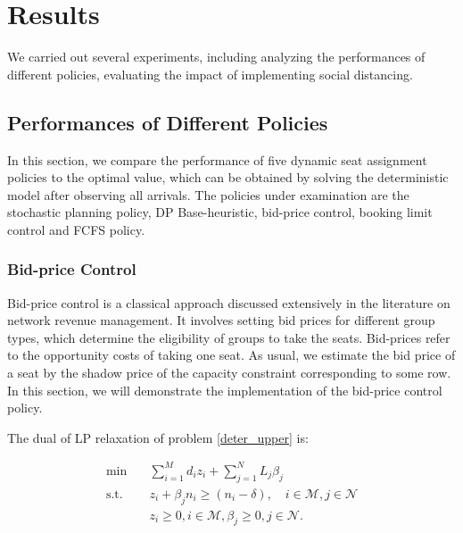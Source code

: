 \section{Results}
We carried out several experiments, including analyzing the performances of different policies, evaluating the impact of implementing social distancing.


\subsection{Performances of Different Policies}
In this section, we compare the performance of five dynamic seat assignment policies to the optimal value, which can be obtained by solving the deterministic model after observing all arrivals. The policies under examination are the stochastic planning policy, DP Base-heuristic, bid-price control, booking limit control and FCFS policy. 


\subsubsection*{Bid-price Control}
Bid-price control is a classical approach discussed extensively in the literature on network revenue management. It involves setting bid prices for different group types, which determine the eligibility of groups to take the seats. Bid-prices refer to the opportunity costs of taking one seat. As usual, we estimate the bid price of a seat by the shadow price of the capacity constraint corresponding to some row. In this section, we will demonstrate the implementation of the bid-price control policy. 

The dual of LP relaxation of problem \eqref{deter_upper} is:

\begin{equation}\label{bid-price_dual}
  \begin{aligned}
  \min \quad & \sum_{i=1}^{M} d_i z_i + \sum_{j= 1}^{N} L_j \beta_{j} \\
  \text {s.t.} \quad & z_{i} + \beta_j n_i \geq (n_i-\delta), \quad i \in \mathcal{M}, j \in \mathcal{N} \\
  & z_{i} \geq 0, i \in \mathcal{M}, \beta_{j} \geq 0, j \in \mathcal{N}.
  \end{aligned}
\end{equation}

